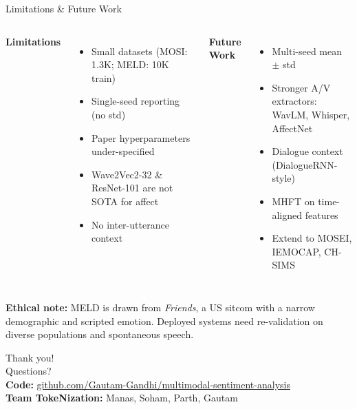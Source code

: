 \documentclass[aspectratio=169,10pt]{beamer}
\begin{document}
\begin{frame}{Limitations \& Future Work}
  \begin{columns}[t]
    \textbf{Limitations}
    \begin{itemize}
      \item Small datasets (MOSI: 1.3K; MELD: 10K train)
      \item Single-seed reporting (no std)
      \item Paper hyperparameters under-specified
      \item Wave2Vec2-32 \& ResNet-101 are not SOTA for affect
      \item No inter-utterance context
    \end{itemize}

    \textbf{Future Work}
    \begin{itemize}
      \item Multi-seed mean $\pm$ std
      \item Stronger A/V extractors: \\ WavLM, Whisper, AffectNet
      \item Dialogue context (DialogueRNN-style)
      \item MHFT on time-aligned features
      \item Extend to MOSEI, IEMOCAP, CH-SIMS
    \end{itemize}
  \end{columns}
  \vfill
  \footnotesize
  \textbf{Ethical note:} MELD is drawn from \emph{Friends}, a US sitcom with a narrow demographic and scripted emotion. Deployed systems need re-validation on diverse populations and spontaneous speech.
\end{frame}

\begin{frame}[standout]
  \begin{center}
    \huge Thank you!\\[1em]
    \normalsize Questions?\\[2em]
    \small
    \textbf{Code:} \url{github.com/Gautam-Gandhi/multimodal-sentiment-analysis}\\[0.5em]
    \textbf{Team TokeNization:} Manas, Soham, Parth, Gautam
  \end{center}
\end{frame}
\end{document}
